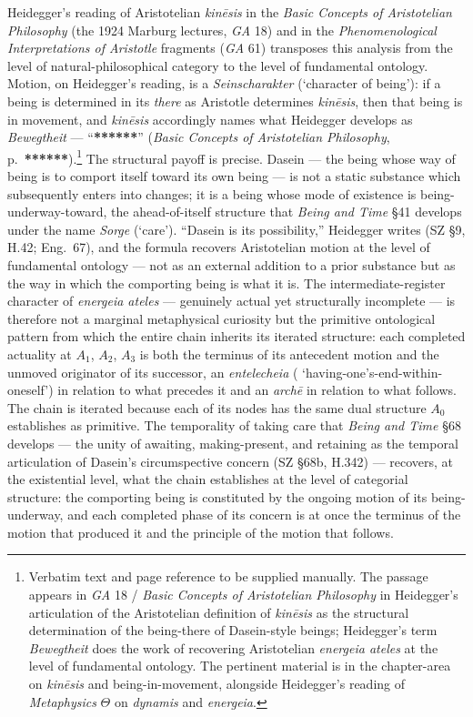 Heidegger's reading of Aristotelian \textit{kinēsis} in the \textit{Basic Concepts of Aristotelian Philosophy} (the 1924 Marburg lectures, \textit{GA} 18) and in the \textit{Phenomenological Interpretations of Aristotle} fragments (\textit{GA} 61) transposes this analysis from the level of natural-philosophical category to the level of fundamental ontology. Motion, on Heidegger's reading, is a \textit{Seinscharakter} (`character of being'): if a being is determined in its \textit{there} as Aristotle determines \textit{kinēsis}, then that being is in movement, and \textit{kinēsis} accordingly names what Heidegger develops as \textit{Bewegtheit} --- ``\textbf{******}'' (\textit{Basic Concepts of Aristotelian Philosophy}, p.~\textbf{******}).\footnote{Verbatim text and page reference to be supplied manually. The passage appears in \textit{GA} 18 / \textit{Basic Concepts of Aristotelian Philosophy} in Heidegger's articulation of the Aristotelian definition of \textit{kinēsis} as the structural determination of the being-there of Dasein-style beings; Heidegger's term \textit{Bewegtheit} does the work of recovering Aristotelian \textit{energeia ateles} at the level of fundamental ontology. The pertinent material is in the chapter-area on \textit{kinēsis} and being-in-movement, alongside Heidegger's reading of \textit{Metaphysics} $\Theta$ on \textit{dynamis} and \textit{energeia}.} The structural payoff is precise. Dasein --- the being whose way of being is to comport itself toward its own being --- is not a static substance which subsequently enters into changes; it is a being whose mode of existence is being-underway-toward, the ahead-of-itself structure that \textit{Being and Time} \S 41 develops under the name \textit{Sorge} (`care'). ``Dasein is its possibility,'' Heidegger writes (SZ \S 9, H.42; Eng.~67), and the formula recovers Aristotelian motion at the level of fundamental ontology --- not as an external addition to a prior substance but as the way in which the comporting being is what it is. The intermediate-register character of \textit{energeia ateles} --- genuinely actual yet structurally incomplete --- is therefore not a marginal metaphysical curiosity but the primitive ontological pattern from which the entire chain inherits its iterated structure: each completed actuality at $A_1$, $A_2$, $A_3$ is both the terminus of its antecedent motion and the unmoved originator of its successor, an \textit{entelecheia} ( `having-one's-end-within-oneself') in relation to what precedes it and an \textit{archē} in relation to what follows. The chain is iterated because each of its nodes has the same dual structure $A_0$ establishes as primitive. The temporality of taking care that \textit{Being and Time} \S 68 develops --- the unity of awaiting, making-present, and retaining as the temporal articulation of Dasein's circumspective concern (SZ \S 68b, H.342) --- recovers, at the existential level, what the chain establishes at the level of categorial structure: the comporting being is constituted by the ongoing motion of its being-underway, and each completed phase of its concern is at once the terminus of the motion that produced it and the principle of the motion that follows.

